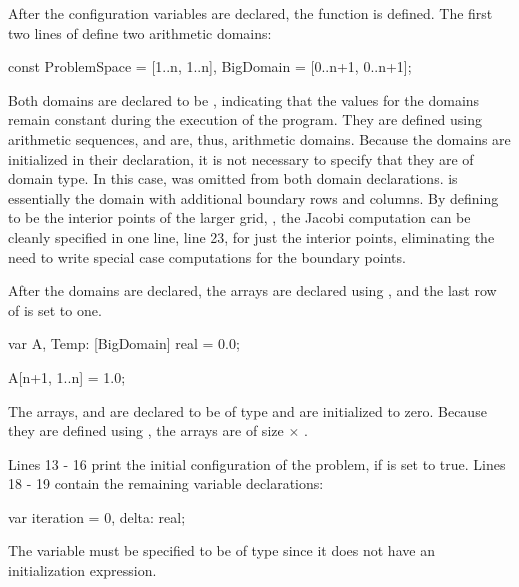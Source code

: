 After the configuration variables are declared, the  function
is defined.  The first two lines of  define two arithmetic domains:
\begin{chapel}
  const ProblemSpace = [1..n, 1..n],
        BigDomain = [0..n+1, 0..n+1];
\end{chapel}
Both domains are declared to be , indicating
that the values for the domains remain constant during the execution of
the program.  They are defined using arithmetic sequences, and are, thus,
arithmetic domains.  Because the domains are initialized in their declaration,
it is not necessary to specify that they are of domain type.  In this case,
 was omitted from both domain declarations.  
 is essentially the  
domain with additional 
boundary rows and columns.  By defining  to be the interior
points of the larger grid, , the Jacobi computation can be cleanly 
specified in one line, line 23, for just the interior points, 
eliminating the need to write special case computations for the boundary points.

After the domains are declared, the arrays are declared using ,
and the last row of  is set to one.
\begin{chapel}
  var A, Temp: [BigDomain] real = 0.0;

  A[n+1, 1..n] = 1.0;
\end{chapel}
The arrays,  and  are declared to be of type  and
are initialized to zero.  Because they are defined using , the
arrays are of size  $\times$ . 

Lines 13 - 16 print the initial configuration of the problem, if 
is set to true.  Lines 18 - 19 contain the remaining variable declarations:
\begin{chapel}
  var iteration = 0,
      delta: real;
\end{chapel}
The variable  must be specified to be of type  since
it does not have an initialization expression.

